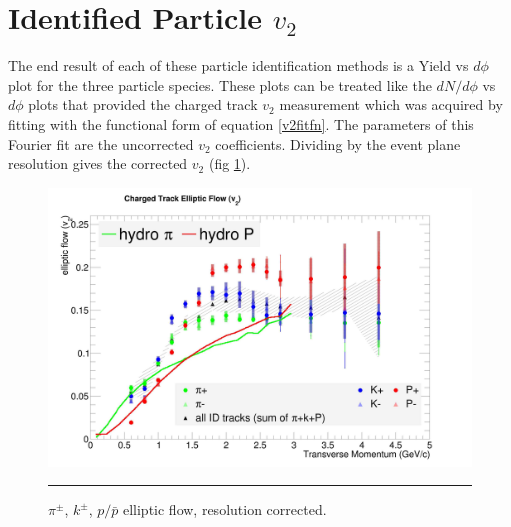 \section{Identified Particle $v_{2}$}
The end result of each of these particle identification methods is a Yield vs $d\phi$ plot for the three particle species. These plots can be treated like the $dN/d\phi$ vs $d\phi$ plots that provided the charged track $v_2$ measurement which was acquired by fitting with the functional form of equation \ref{v2fitfn}. The parameters of this Fourier fit are the uncorrected $v_2$ coefficients. Dividing by the event plane resolution gives the corrected $v_2$ (fig \ref{fig:v2all}).

\begin{figure}[htbp!]
  \centering
    \includegraphics[width=1\textwidth]{v2all.jpg}
    \rule{35em}{0.5pt}
  \caption[$\pi^{\pm}$, $k^{\pm}$, $p/\bar{p}$ elliptic flow,$\sqrt{s_{NN}}=$200 GeV d+Au collisions]{$\pi^{\pm}$, $k^{\pm}$, $p/\bar{p}$ elliptic flow, resolution corrected.}
  \label{fig:v2all}
\end{figure}

\pagebreak
\pagebreak
